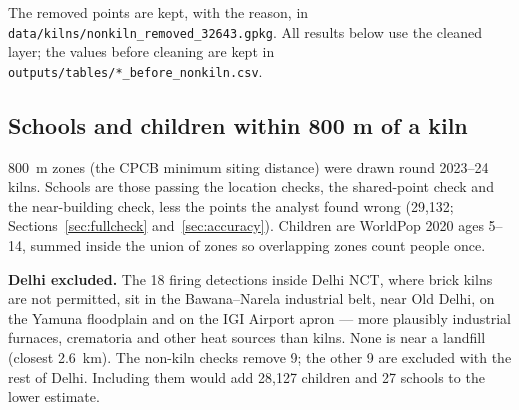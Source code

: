 \documentclass[11pt,a4paper]{article}
\begin{document}
The removed points are kept, with the reason, in
\texttt{data/kilns/nonkiln\_removed\_32643.gpkg}. All results below use the
cleaned layer; the values before cleaning are kept in
\texttt{outputs/tables/*\_before\_nonkiln.csv}.

\subsection{Schools and children within 800 m of a kiln}
800~m zones (the CPCB minimum siting distance) were drawn round 2023--24 kilns.
Schools are those passing the location checks, the shared-point check and the near-building check, less the points the analyst found wrong (29{,}132; Sections~\ref{sec:fullcheck} and~\ref{sec:accuracy}). Children are WorldPop
2020 ages 5--14, summed inside the union of zones so overlapping zones count
people once.

\textbf{Delhi excluded.} The 18 firing detections inside Delhi NCT, where
brick kilns are not permitted, sit in the Bawana--Narela industrial belt, near
Old Delhi, on the Yamuna floodplain and on the IGI Airport apron --- more
plausibly industrial furnaces, crematoria and other heat sources than kilns.
None is near a landfill (closest 2.6~km). The non-kiln checks remove 9; the
other 9 are excluded with the rest of Delhi. Including them would add 28{,}127
children and 27 schools to the lower estimate.
\end{document}
